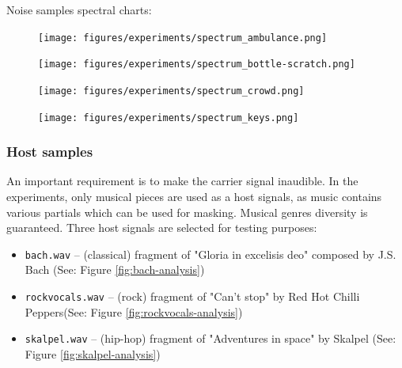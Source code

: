 \clearpage

Noise samples spectral charts:

\begin{figure}[!hb]
\centering
\begin{minipage}[b]{0.45\textwidth}
  \texttt{[image: figures/experiments/spectrum\_ambulance.png]}
  \label{fig:ambulance-analysis}
\end{minipage}\hfill
\begin{minipage}[b]{0.45\linewidth}
  \texttt{[image: figures/experiments/spectrum\_bottle-scratch.png]}
  \label{fig:bottle-scratch-analysis}
\end{minipage}
\end{figure}
\begin{figure}[!hb]
\begin{minipage}[b]{0.45\textwidth}
  \texttt{[image: figures/experiments/spectrum\_crowd.png]}
  \label{fig:crowd-analysis}
\end{minipage}\hfill
\begin{minipage}[b]{0.45\textwidth}
  \texttt{[image: figures/experiments/spectrum\_keys.png]}
  \label{fig:keys-analysis}
\end{minipage}
\end{figure}

\subsubsection{Host samples}
An important requirement is to make the carrier signal inaudible. In the experiments, only musical pieces
are used as a host signals, as music contains various partials which can be used for masking. Musical genres diversity is guaranteed.
Three host signals are selected for testing purposes:
\begin{itemize}
  \item \verb|bach.wav| -- (classical) fragment of "Gloria in excelisis deo" composed by J.S. Bach (See: Figure \ref{fig:bach-analysis})
  \item \verb|rockvocals.wav| -- (rock) fragment of "Can't stop" by Red Hot Chilli Peppers(See: Figure \ref{fig:rockvocals-analysis})
  \item \verb|skalpel.wav| -- (hip-hop) fragment of "Adventures in space" by Skalpel (See: Figure \ref{fig:skalpel-analysis})
\end{itemize}

